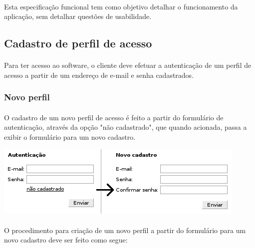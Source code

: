 \documentclass[a4paper,12pt]{article}
\begin{document}
\paragraph{}
Esta especificação funcional tem como objetivo detalhar o funcionamento da
aplicação, sem detalhar questões de usabilidade.

\subsection{Cadastro de perfil de acesso}

\paragraph{}
Para ter acesso ao software, o cliente deve efetuar a autenticação de um perfil
de acesso a partir de um endereço de e-mail e senha cadastrados.

\subsubsection{Novo perfil}

\paragraph{}
O cadastro de um novo perfil de acesso é feito a partir do formulário de
autenticação, através da opção "não cadastrado", que quando acionada, passa a
exibir o formulário para um novo cadastro. 

\begin{center}
\includegraphics[scale=0.8]{authform.png}
\end{center}

\paragraph{}
O procedimento para criação de um novo perfil a partir do formulário para um
novo cadastro deve ser feito como segue:
\end{document}

